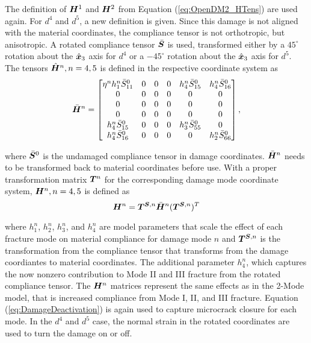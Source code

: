 \documentclass[11pt]{article}
\begin{document}
The definition of \(\bm{H}^1\) and \(\bm{H}^2\) from
Equation (\ref{eq:OpenDM2_HTens}) are used again. For \(d^4\) and \(d^5\),
a new definition is given. Since this damage is not aligned with the
material coordinates, the compliance tensor is not orthotropic, but
anisotropic. A rotated compliance tensor \(\bar{\bm{S}}\) is used,
transformed either by a \(45^\circ\) rotation about the \(\hat{\bm{x}}_3\)
axis for \(d^4\) or a \(-45^\circ\) rotation about the \(\hat{\bm{x}}_3\) axis
for \(d^5\). The tensors \(\hat{\bm{H}}^n, n = 4,5\) is defined in the
respective coordinate system as
\begin{equation}
  \label{eq:OpenDM4_HTens}
  \bar{\bm{H}}^n =
  \begin{bmatrix}
    \eta^n h_1^n \bar{S}_{11}^0 & 0 & 0 & 0 & h_4^n \bar{S}_{15}^0 & h_4^n \bar{S}_{16}^0 \\
    0 & 0 & 0 & 0 & 0 & 0 \\
    0 & 0 & 0 & 0 & 0 & 0 \\
    0 & 0 & 0 & 0 & 0 & 0 \\
    h_4^n \bar{S}_{15}^0 & 0 & 0 & 0 & h_3^n \bar{S}_{55}^0 & 0 \\
    h_4^n \bar{S}_{16}^0 & 0 & 0 & 0 & 0 & h_2^n \bar{S}_{66}^0 \\
  \end{bmatrix},
\end{equation}

where \(\bar{\bm{S}}^0\) is the undamaged compliance tensor in damage
coordinates. \(\bar{\bm{H}}^n\) needs to be transformed back to material
coordinates before use. With a proper transformation matrix
\(\bm{T}^n\) for the corresponding damage mode coordinate
system, \(\bm{H}^n, n = 4,5\) is defined as
\begin{equation}
  \label{eq:OpenDM4_HTrans}
  \bm{H}^n = \bm{T}^{\bm{S},n} \bar{\bm{H}}^n (\bm{T}^{\bm{S},n})^T
\end{equation}

where \(h_1^n\), \(h_2^n\), \(h_3^n\), and \(h_4^n\) are model parameters that scale
the effect of each fracture mode on material compliance for damage
mode \(n\) and \(\bm{T}^{\bm{S},n}\) is the transformation from the
compliance tensor that transforms from the damage coordiantes to
material coordinates. The additional parameter \(h_4^n\), which captures
the now nonzero contribution to Mode II and III fracture from the
rotated compliance tensor. The \(\bm{H}^n\) matrices represent the
same effects as in the 2-Mode model, that is increased compliance from
Mode I, II, and III fracture. Equation (\ref{eq:DamageDeactivation})
is again used to capture microcrack closure for each mode. In the
\(d^4\) and \(d^5\) case, the normal strain in the rotated coordinates are
used to turn the damage on or off. 
\end{document}
